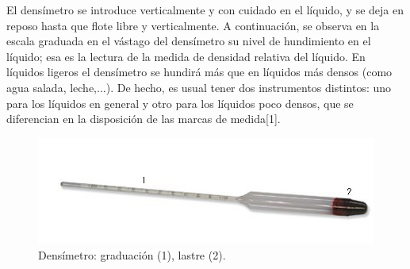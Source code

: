 \documentclass[DIV=calc, paper=a4, fontsize=11pt]{scrartcl}
\begin{document}
El densímetro se introduce verticalmente y con cuidado en el líquido, y se deja en reposo hasta que flote libre y verticalmente. A continuación, se observa en la escala graduada en el vástago del densímetro su nivel de hundimiento en el líquido; esa es la lectura de la medida de densidad relativa del líquido. En líquidos ligeros el densímetro se hundirá más que en líquidos más densos (como agua salada, leche,...). De hecho, es usual tener dos instrumentos distintos: uno para los líquidos en general y otro para los líquidos poco densos, que se diferencian en la disposición de las marcas de medida[1].

\begin{figure}
    \centering
    \includegraphics[scale=0.8]{densimetro.jpg}
    \caption{Densímetro: graduación (1), lastre (2).}
    \label{fig:my_label}
\end{figure}
\end{document}
